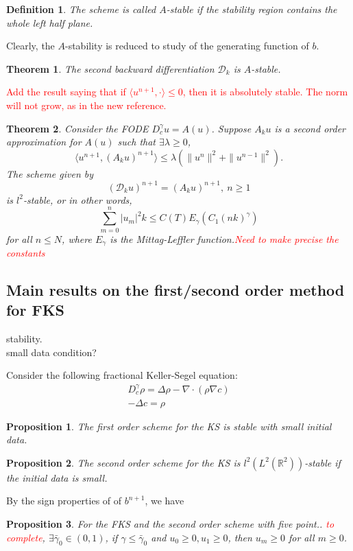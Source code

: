 \documentclass[11pt]{article} %
\newcommand{\tcr}[1]{\textcolor{red}{#1}}
\newtheorem{thm}{Theorem}
\newtheorem{pro}{Proposition}
\newtheorem{defi}{Definition}
\begin{document}
\begin{defi}
The scheme is called $A$-stable if the stability region contains the whole left half plane. 
\end{defi}
Clearly, the $A$-stability is reduced to study of the generating function of $b$.
\begin{thm}
The second backward differentiation $\mathcal{D}_k$ is $A$-stable. 
\end{thm}

\tcr{Add the result saying that if $\langle u^{n+1}, \cdot\rangle\le 0$, then it is absolutely stable. The norm will not grow, as in the new reference.}

\begin{thm}
Consider the FODE $D_c^{\gamma}u=A(u)$. Suppose $A_ku$ is a second order approximation for $A(u)$ such that $\exists\lambda\ge 0$, $$
\langle u^{n+1}, (A_ku)^{n+1}\rangle \le \lambda(\|u^{n}\|^2+\|u^{n-1}\|^2).
$$
The scheme given by
$$
(\mathcal{D}_ku)^{n+1}=(A_ku)^{n+1}, \ n\ge 1
$$
is $l^2$-stable, or in other words, $$
\sum_{m=0}^n |u_m|^2k\le C(T)E_{\gamma}(C_1(nk)^{\gamma})
$$
for all $n\le N$, where $E_{\gamma}$ is the Mittag-Leffler function.\tcr{Need to make precise the constants}
\end{thm}



\subsection{Main results on the first/second order method for FKS}
stability.\\
small data condition?

Consider the following fractional Keller-Segel equation:
\begin{gather*}
D_c^{\gamma}\rho=\Delta\rho-\nabla\cdot(\rho\nabla c)\\
-\Delta c=\rho
\end{gather*}

\begin{pro}
The first order scheme for the KS is stable with small initial data.
\end{pro}


\begin{pro}
The second order scheme for the KS is $l^2(L^2(\mathbb{R}^2))$-stable if the initial data is small.
\end{pro}


By the sign properties of of $b^{n+1}$, we have 
\begin{pro}
For the FKS and the second order scheme with five point.. \tcr{to complete},
$\exists \bar{\gamma}_0\in (0, 1)$, if $\gamma\le\bar{\gamma}_0$ and $u_0\ge 0, u_1\ge 0$, then $u_m\ge 0$ for all $m\ge 0$.
\end{pro}
\end{document}

